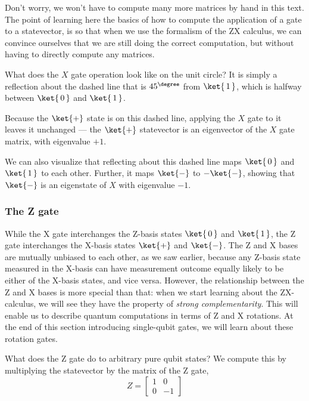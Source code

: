 \documentclass{article}
\theoremstyle{definition}
\newcommand{\kz}[1]{\ket{\,#1\,}}
\newcommand{\kx}[1]{\ket{#1}}
\begin{document}
Don't worry, we won't have to compute many more matrices by hand in this text.
The point of learning here the basics of how to compute the application of a gate to a statevector, is so that when we use the formalism of the ZX calculus, we can convince ourselves that we are still doing the correct computation, but without having to directly compute any matrices.

What does the $X$ gate operation look like on the unit circle?
It is simply a reflection about the dashed line that is $45^{\degree}$ from $\kz1$, which is halfway between $\kz0$ and $\kz1$.
\begin{figure}[H]
\end{figure}
Because the $\kx+$ state is on this dashed line, applying the $X$ gate to it leaves it unchanged --- the $\kx+$ statevector is an eigenvector of the $X$ gate matrix, with eigenvalue $+1$.

We can also visualize that reflecting about this dashed line maps $\kz0$ and $\kz1$ to each other.
Further, it maps $\kx-$ to $-\kx-$, showing that $\kx-$ is an eigenstate of $X$ with eigenvalue $-1$.
\begin{figure}[H]
\end{figure}


\subsubsection{The Z gate}
While the X gate interchanges the Z-basis states $\kz0$ and $\kz1$, the Z gate interchanges the X-basis states $\kx+$ and $\kx-$.  The Z and X bases are mutually unbiased to each other, as we saw earlier, because any Z-basis state measured in the X-basis can have measurement outcome equally likely to be either of the X-basis states, and vice versa.
However, the relationship between the Z and X bases is more special than that: when we start learning about the ZX-calculus, we will see they have the property of \textit{strong complementarity}.
This will enable us to describe quantum computations in terms of Z and X rotations.  At the end of this section introducing single-qubit gates, we will learn about these rotation gates.

What does the Z gate do to arbitrary pure qubit states?
We compute this by multiplying the statevector by the matrix of the Z gate,
\begin{equation}
	Z = \begin{bmatrix}
		1 & 0\\
		0 & -1
	\end{bmatrix}
\end{equation}
\end{document}
